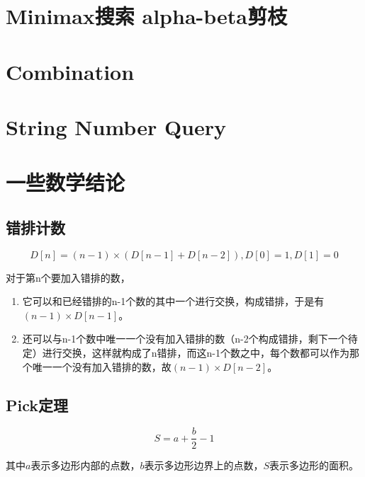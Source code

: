 \section{Minimax搜索 alpha-beta剪枝}

\section{Combination}

\section{String Number Query}

\section{一些数学结论}
\subsection{错排计数}
$$D[n] = (n-1)\times(D[n-1]+D[n-2]), D[0] = 1, D[1] = 0$$

对于第n个要加入错排的数，
\begin{enumerate}
  \item 它可以和已经错排的n-1个数的其中一个进行交换，构成错排，于是有 $(n-1)\times D[n-1]$。
  \item 还可以与n-1个数中唯一一个没有加入错排的数（n-2个构成错排，剩下一个待定）进行交换，这样就构成了n错排，而这n-1个数之中，每个数都可以作为那个唯一一个没有加入错排的数，故$(n-1)\times D[n-2]$。
\end{enumerate}

\subsection{Pick定理}
$$S=a+\frac{b}{2}-1$$

其中$a$表示多边形内部的点数，$b$表示多边形边界上的点数，$S$表示多边形的面积。